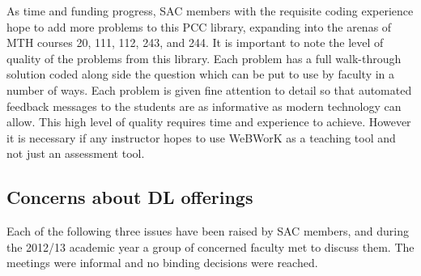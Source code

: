 As time and funding progress, SAC members with the requisite coding experience hope to add more problems to this PCC library, expanding into the arenas of MTH courses 20, 111, 112, 243, and 244.
It is important to note the level of quality of the problems from this library.
Each problem has a full walk-through solution coded along side the question which can be put to use by faculty in a number of ways.
Each problem is given fine attention to detail so that automated feedback messages to the students are as informative as modern technology can allow.
This high level of quality requires time and experience to achieve.
However it is necessary if any instructor hopes to use WeBWorK as a teaching tool and not just an assessment tool.

\subsection{Concerns about DL offerings}
Each of the following three issues have been raised by SAC members, and during the 2012/13 academic year a group of concerned faculty met to discuss them.
The meetings were informal and no binding decisions were reached.
